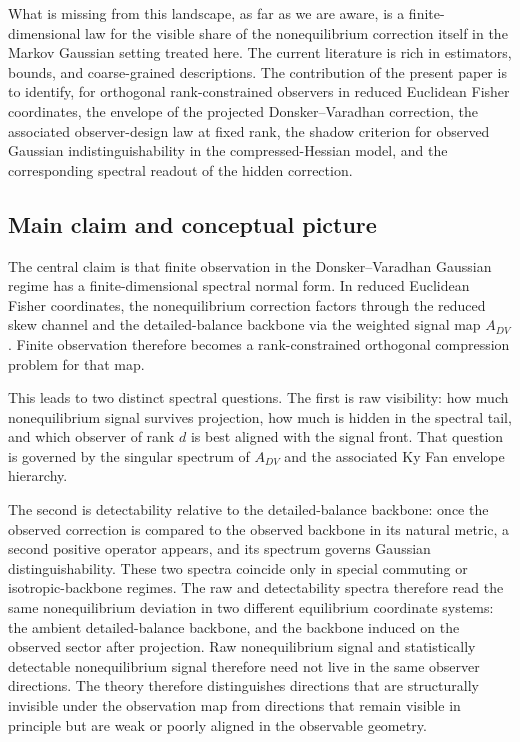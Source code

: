 \documentclass[11pt,a4paper]{article}
\numberwithin{equation}{section}
\theoremstyle{thmcompact}
\theoremstyle{remark}
\begin{document}
What is missing from this landscape, as far as we are aware, is a finite-dimensional law for the visible share of the nonequilibrium correction itself in the Markov Gaussian setting treated here. The current literature is rich in estimators, bounds, and coarse-grained descriptions. The contribution of the present paper is to identify, for orthogonal rank-constrained observers in reduced Euclidean Fisher coordinates, the envelope of the projected Donsker--Varadhan correction, the associated observer-design law at fixed rank, the shadow criterion for observed Gaussian indistinguishability in the compressed-Hessian model, and the corresponding spectral readout of the hidden correction.

\subsection{Main claim and conceptual picture}

The central claim is that finite observation in the Donsker--Varadhan Gaussian regime has a finite-dimensional spectral normal form. In reduced Euclidean Fisher coordinates, the nonequilibrium correction factors through the reduced skew channel and the detailed-balance backbone via the weighted signal map \(A_{DV}\). Finite observation therefore becomes a rank-constrained orthogonal compression problem for that map.

This leads to two distinct spectral questions. The first is raw visibility: how much nonequilibrium signal survives projection, how much is hidden in the spectral tail, and which observer of rank \(d\) is best aligned with the signal front. That question is governed by the singular spectrum of \(A_{DV}\) and the associated Ky Fan envelope hierarchy.

The second is detectability relative to the detailed-balance backbone: once the observed correction is compared to the observed backbone in its natural metric, a second positive operator appears, and its spectrum governs Gaussian distinguishability. These two spectra coincide only in special commuting or isotropic-backbone regimes. The raw and detectability spectra therefore read the same nonequilibrium deviation in two different equilibrium coordinate systems: the ambient detailed-balance backbone, and the backbone induced on the observed sector after projection. Raw nonequilibrium signal and statistically detectable nonequilibrium signal therefore need not live in the same observer directions. The theory therefore distinguishes directions that are structurally invisible under the observation map from directions that remain visible in principle but are weak or poorly aligned in the observable geometry.
\end{document}

